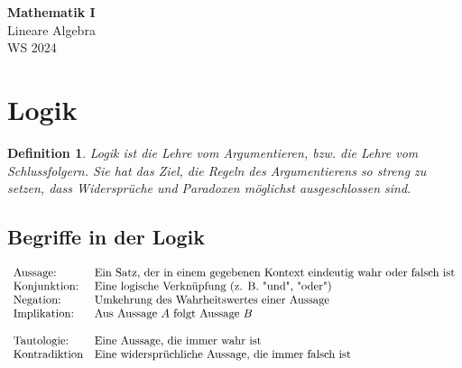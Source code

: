 \documentclass[11pt]{article}
\begin{document}
\thispagestyle{empty}

\newtheorem{definition}{Definition}[section]
\newtheorem{anmk}{Anmerkung}[section]
\newtheorem{bsp}{Beispiel}[section]

\newcommand{\ol}[1]{\begin{enumerate}#1\end{enumerate}}
\newcommand{\ul}[1]{\begin{itemize}#1\end{itemize}}
\newcommand{\li}[1]{\item{#1}}
\newcommand{\equivto}{\Longleftrightarrow}
\newcommand{\sube}{\subseteq}

\newcommand{\N}{\mathbb{N}}
\newcommand{\Z}{\mathbb{Z}}
\newcommand{\R}{\mathbb{R}}

\begin{center}
  {\LARGE \bf Mathematik I}\\
  {\Large Lineare Algebra}\\
  WS 2024
\end{center}

\section{Logik}
\begin{definition}
  Logik ist die \textit{Lehre vom Argumentieren}, bzw. die \textit{Lehre vom Schlussfolgern}.
  Sie hat das Ziel, die Regeln des Argumentierens so streng zu setzen, dass Widersprüche und Paradoxen möglichst
  ausgeschlossen sind.
\end{definition}
\subsection{Begriffe in der Logik}
$
  \begin{array}{l l}
    \text{Aussage:}      & \text{Ein Satz, der in einem gegebenen Kontext eindeutig wahr oder falsch ist} \\
    \text{Konjunktion:}  & \text{Eine logische Verknüpfung (z. B. "und", "oder")}                         \\
    \text{Negation:}     & \text{Umkehrung des Wahrheitswertes einer Aussage}                             \\
    \text{Implikation:}  & \text{Aus Aussage $A$ folgt Aussage $B$}                                       \\\\
    \text{Tautologie:}   & \text{Eine Aussage, die immer wahr ist}                                        \\
    \text{Kontradiktion} & \text{Eine widersprüchliche Aussage, die immer falsch ist}                     \\
  \end{array}
$
\end{document}
